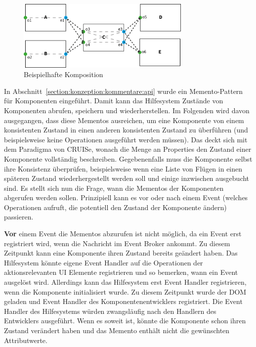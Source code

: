 \documentclass[
	headsepline,
	footsepline,
	fontsize=12pt,
	bibliography=totoc
]{scrbook}
\begin{document}
\begin{figure}[htbp]
   \centering
   \includegraphics[width=0.75\textwidth]{images/konzeption-dependency-graph-example.png}
   \caption{Beispielhafte Komposition}
   \label{figure:dependency-graph-example}
\end{figure}

In Abschnitt~\ref{section:konzeption:kommentare:api} wurde ein Memento-Pattern für Komponenten eingeführt. Damit kann das Hilfesystem Zustände von Komponenten abrufen, speichern und wiederherstellen. Im Folgenden wird davon ausgegangen, dass diese Mementos ausreichen, um eine Komponente von einem konsistenten Zustand in einen anderen konsistenten Zustand zu überführen (und beispielsweise keine Operationen ausgeführt werden müssen). Das deckt sich mit dem Paradigma von CRUISe, wonach die Menge an Properties den Zustand einer Komponente vollständig beschreiben. Gegebenenfalls muss die Komponente selbst ihre Konsistenz überprüfen, beispielsweise wenn eine Liste von Flügen in einen späteren Zustand wiederhergestellt werden soll und einige inzwischen ausgebucht sind. Es stellt sich nun die Frage, wann die Mementos der Komponenten abgerufen werden sollen. Prinzipiell kann es vor oder nach einem Event (welches Operationen aufruft, die potentiell den Zustand der Komponente ändern) passieren.


\textbf{Vor} einem Event die Mementos abzurufen ist nicht möglich, da ein Event erst registriert wird, wenn die Nachricht im Event Broker ankommt. Zu diesem Zeitpunkt kann eine Komponente ihren Zustand bereits geändert haben. Das Hilfesystem könnte eigene Event Handler auf die Operationen der aktionsrelevanten UI Elemente registrieren und so bemerken, wann ein Event ausgelöst wird. Allerdings kann das Hilfesystem erst Event Handler registrieren, wenn die Komponente initialisiert wurde. Zu diesem Zeitpunkt wurde der DOM geladen und Event Handler des Komponentenentwicklers registriert. Die Event Handler des Hilfesystems würden zwangsläufig nach den Handlern des Entwicklers ausgeführt. Wenn es soweit ist, könnte die Komponente schon ihren Zustand verändert haben und das Memento enthält nicht die gewünschten Attributwerte.
\end{document}

